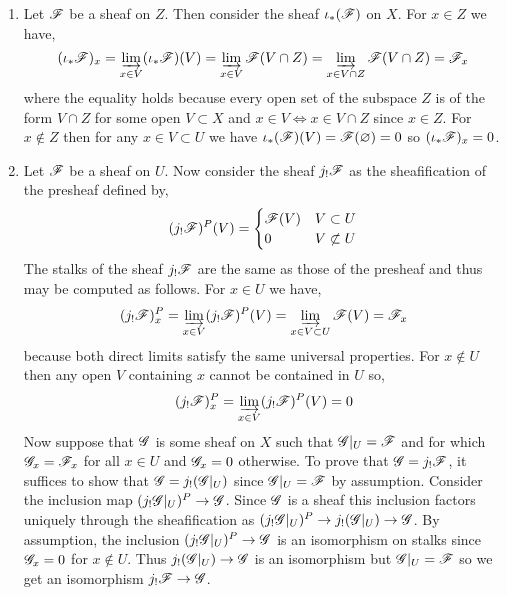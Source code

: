 \documentclass[12pt]{article}
\begin{document}
\begin{enumerate}
\item Let $\mathscr{F}$ be a sheaf on $Z$. Then consider the sheaf $\iota_*(\mathscr{F})$ on $X$. For $x \in Z$ we have, 
\[ (\iota_* \mathscr{F})_x = \varinjlim_{x \in V} (\iota_* \mathscr{F})(V) = \varinjlim_{x \in V} \mathscr{F}(V \cap Z) = \varinjlim_{x \in V \cap Z} \mathscr{F}(V \cap Z) = \mathscr{F}_x \]
where the equality holds because every open set of the subspace $Z$ is of the form $V \cap Z$  for some open $V \subset X$ and $x \in V \iff x \in V \cap Z$ since $x \in Z$.
For $x \notin Z$ then for any $x \in V \subset U$ we have $\iota_*(\mathscr{F})(V) = \mathscr{F}(\varnothing) = 0$ so $(\iota_* \mathscr{F})_x = 0$. 

\item Let $\mathscr{F}$ be a sheaf on $U$. Now consider the sheaf $j_! \mathscr{F}$ as the sheafification of the presheaf defined by,
\[ (j_! \mathscr{F})^P(V) = \begin{cases}
\mathscr{F}(V) & V \subset U 
\\
0 & V \not\subset U
\end{cases} \]
The stalks of the sheaf $j_! \mathscr{F}$ are the same as those of the presheaf and thus may be computed as follows.
For $x \in U$ we have,
\[ (j_! \mathscr{F})^P_x = \varinjlim_{x \in V} (j_! \mathscr{F})^P(V) = \varinjlim_{x \in V \subset U} \mathscr{F}(V) = \mathscr{F}_x \]
because both direct limits satisfy the same universal properties. For $x \notin U$ then any open $V$ containing $x$ cannot be contained in $U$ so,
\[ (j_! \mathscr{F})^P_x = \varinjlim_{x \in V} (j_! \mathscr{F})^P(V) = 0 \]
Now suppose that $\mathscr{G}$ is some sheaf on $X$ such that $\mathscr{G}|_U = \mathscr{F}$ and for which $\mathscr{G}_x = \mathscr{F}_x$ for all $x \in U$ and $\mathscr{G}_x = 0$ otherwise. To prove that $\mathscr{G} = j_! \mathscr{F}$, it suffices to show that $\mathscr{G} = j_! (\mathscr{G}|_U)$ since $\mathscr{G}|_U = \mathscr{F}$ by assumption. Consider the inclusion map $(j_! \mathscr{G}|_U)^P \to \mathscr{G}$. Since $\mathscr{G}$ is a sheaf this inclusion factors uniquely through the sheafification as $(j_! \mathscr{G} |_U)^P \to j_! (\mathscr{G}|_U) \to \mathscr{G}$. By assumption, the inclusion $(j_! \mathscr{G}|_U)^P \to \mathscr{G}$ is an isomorphism on stalks since $\mathscr{G}_x = 0$ for $x \notin U$. Thus $j_! (\mathscr{G}|_U) \to \mathscr{G}$ is an isomorphism but $\mathscr{G}|_U = \mathscr{F}$ so we get an isomorphism $j_! \mathscr{F} \to \mathscr{G}$. 



\end{enumerate}
\end{document}
